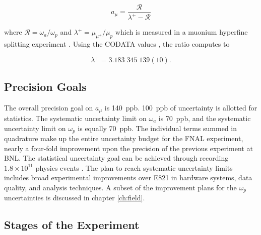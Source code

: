 \begin{equation}
\label{eqn:g-2-result-2}
a_\mu = \frac{\mathcal{R}}{\lambda^+ - \mathcal{R}}
\end{equation}

\noindent
where $\mathcal{R} = \omega_a / \omega_p$ and $\lambda^+ = \mu_{\mu^+} / \mu_p$  which is measured in a muonium hyperfine splitting experiment \cite{muonium-hyperfine}.  Using the CODATA values \cite{codata}, the ratio computes to

\begin{equation}
\label{eqn:muon-to-proton-mu-ratio}
\lambda^+ = 3.183\;345\;139(10).
\end{equation}




\subsection{Precision Goals}

The overall precision goal on $a_\mu$ is \SI{140}{ppb}.  \SI{100}{ppb} of uncertainty is allotted for statistics.  The systematic uncertainty limit on $\omega_a$ is \SI{70}{ppb}, and the systematic uncertainty limit on $\omega_p$ is equally \SI{70}{ppb}.  The individual terms summed in quadrature make up the entire uncertainty budget for the FNAL \mugmtwo experiment, nearly a four-fold improvement upon the precision of the previous experiment at BNL.  The statistical uncertainty goal can be achieved through recording $1.8\times10^{11}$ physics events \cite{e989-tdr}.  The plan to reach systematic uncertainty limits includes broad experimental improvements over E821 in hardware systems, data quality, and analysis techniques.  A subset of the improvement plans for the $\omega_p$ uncertainties is discussed in chapter \ref{ch:field}.

\subsection{Stages of the Experiment}


